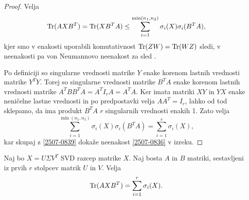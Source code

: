 \begin{proof}
    Velja
    \begin{align}
    \label{2507-0839}
        \operatorname{Tr}(AXB^T) = \operatorname{Tr}(XB^TA) \leq \sum^{\min(n_1, n_2)}_{i=1} \sigma_i(X) \sigma_i(B^TA),
    \end{align}
    kjer smo v enakosti uporabili komutativnost $\operatorname{Tr}(ZW)=\operatorname{Tr}(WZ)$ sledi,
    v neenakosti pa von Neumannovo neenakost za sled \cite{TNNM-HZYLH12}.

    Po definiciji so singularne vrednosti matrike $Y$ enake korenom lastnih vrednosti matrike $Y^TY$. Torej so singularne vrednosti matrike $B^TA$ enake korenom lastnih vrednosti matrike $A^TBB^TA=A^TI_rA = A^TA$. 
    Ker imata matriki $XY$ in $YX$ enake neničelne lastne vrednosti in po predpostavki velja $AA^T = I_r$, lahko
    od tod sklepamo, da ima produkt $B^TA$ $r$ singularnih vrednosti enakih 1.
    Zato velja
    \[
        \sum^{\min(n_1, n_2)}_{i=1} \sigma_i(X) \sigma_i(B^TA) = \sum^{r}_{i=1} \sigma_i(X),
    \]
    kar skupaj z \eqref{2507-0839}
    dokaže neenakost \eqref{2507-0836}
    v izreku.
\end{proof}

\begin{theorem}
\label{2507-0851}
    Naj bo $X = U \Sigma V^T$
    SVD razcep matrike $X$.
    Naj bosta $A$ in $B$ matriki, sestavljeni
    iz prvih $r$ stolpcev matrik $U$ in $V$.
    Velja 
    \[\operatorname{Tr}(AXB^T) = \sum^{r}_{i=1} \sigma_i(X).\]
\end{theorem}

